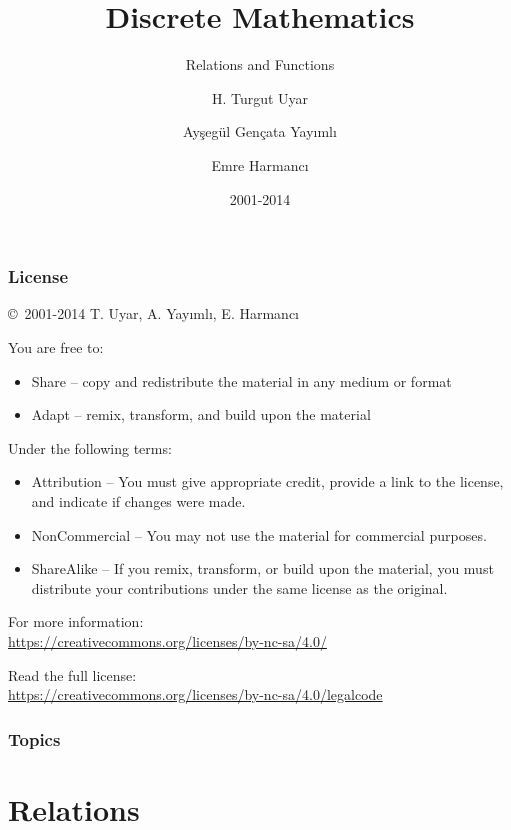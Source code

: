 \documentclass[dvipsnames]{beamer}
\title{Discrete Mathematics}
\subtitle{Relations and Functions}
\author{H. Turgut Uyar \and Ayşegül Gençata Yayımlı \and Emre Harmancı}
\date{2001-2014}
\begin{document}
\begin{frame}
  \titlepage
\end{frame}

\begin{frame}
  \frametitle{License}

  \hfill
  \copyright~2001-2014 T. Uyar, A. Yayımlı, E. Harmancı

  \vfill
  \begin{footnotesize}
    You are free to:
    \begin{itemize}
      \itemsep0em
      \item Share -- copy and redistribute the material in any medium or format
      \item Adapt -- remix, transform, and build upon the material
    \end{itemize}

    Under the following terms:
    \begin{itemize}
      \itemsep0em
      \item Attribution -- You must give appropriate credit, provide a link to
        the license, and indicate if changes were made.

      \item NonCommercial -- You may not use the material for commercial
        purposes.

      \item ShareAlike -- If you remix, transform, or build upon the material,
        you must distribute your contributions under the same license as the
        original.
    \end{itemize}
  \end{footnotesize}

  \begin{small}
    For more information:\\
    \url{https://creativecommons.org/licenses/by-nc-sa/4.0/}

    \smallskip
    Read the full license:\\
    \url{https://creativecommons.org/licenses/by-nc-sa/4.0/legalcode}
  \end{small}
\end{frame}

\begin{frame}
  \frametitle{Topics}
  \tableofcontents
\end{frame}

\section{Relations}
\end{document}
